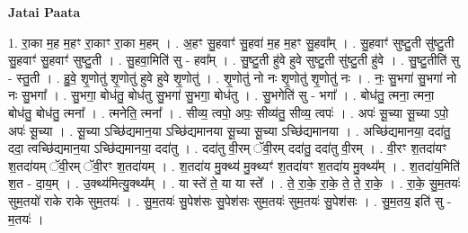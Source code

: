 \documentclass[17pt]{extarticle}
\begin{document}
\textbf{Jatai Paata} \newline

1. रा॒का म॒ह म॒हꣳ रा॒काꣳ रा॒का म॒हम् । . अ॒हꣳ सु॒हवाꣳ॑ सु॒हवा॑ म॒ह म॒हꣳ सु॒हवा᳚म् । . सु॒हवाꣳ॑ सुष्टु॒ती सु॑ष्टु॒ती सु॒हवाꣳ॑ सु॒हवाꣳ॑ सुष्टु॒ती । . सु॒हवा॒मिति॑ सु - हवा᳚म् । . सु॒ष्टु॒ती हु॑वे हुवे सुष्टु॒ती सु॑ष्टु॒ती हु॑वे । . सु॒ष्टु॒तीति॑ सु - स्तु॒ती । . हु॒वे॒ शृ॒णोतु॑ शृ॒णोतु॑ हुवे हुवे शृ॒णोतु॑ । . शृ॒णोतु॑ नो नः शृ॒णोतु॑ शृ॒णोतु॑ नः । . नः॒ सु॒भगा॑ सु॒भगा॑ नो नः सु॒भगा᳚ । . सु॒भगा॒ बोध॑तु॒ बोध॑तु सु॒भगा॑ सु॒भगा॒ बोध॑तु । . सु॒भगेति॑ सु - भगा᳚ । . बोध॑तु॒ त्मना॒ त्मना॒ बोध॑तु॒ बोध॑तु॒ त्मना᳚ । . त्मनेति॒ त्मना᳚ । . सीव्य॒ त्वपो॒ अपः॒ सीव्य॑तु॒ सीव्य॒ त्वपः॑ । . अपः॑ सू॒च्या सू॒च्या ऽपो॒ अपः॑ सू॒च्या । . सू॒च्या ऽच्छि॑द्यमान॒या ऽच्छि॑द्यमानया सू॒च्या सू॒च्या ऽच्छि॑द्यमानया । . अच्छि॑द्यमानया॒ ददा॑तु॒ ददा॒ त्वच्छि॑द्यमान॒या ऽच्छि॑द्यमानया॒ ददा॑तु । . ददा॑तु वी॒रम् ॅवी॒रम् ददा॑तु॒ ददा॑तु वी॒रम् । . वी॒रꣳ श॒तदा॑यꣳ श॒तदा॑यम् ॅवी॒रम् ॅवी॒रꣳ श॒तदा॑यम् । . श॒तदा॑य मु॒क्थ्य॑ मु॒क्थ्यꣳ॑ श॒तदा॑यꣳ श॒तदा॑य मु॒क्थ्य᳚म् । . श॒तदा॑य॒मिति॑ श॒त - दा॒य॒म् । . उ॒क्थ्य॑मित्यु॒क्थ्य᳚म् । . या स्ते॑ ते॒ या या स्ते᳚ । . ते॒ रा॒के॒ रा॒के॒ ते॒ ते॒ रा॒के॒ । . रा॒के॒ सु॒म॒तयः॑ सुम॒तयो॑ राके राके सुम॒तयः॑ । . सु॒म॒तयः॑ सु॒पेश॑सः सु॒पेश॑सः सुम॒तयः॑ सुम॒तयः॑ सु॒पेश॑सः । . सु॒म॒तय॒ इति॑ सु - म॒तयः॑ । \newline
\end{document}
